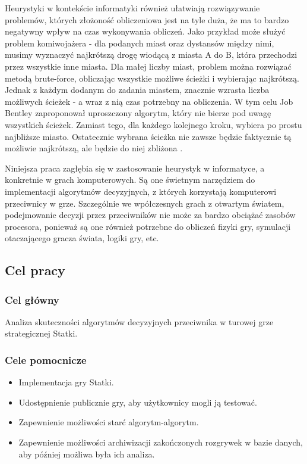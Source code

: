 \indent Heurystyki w kontekście informatyki również ułatwiają rozwiązywanie problemów, których złożoność obliczeniowa jest na tyle duża, że ma to bardzo negatywny wpływ na czas wykonywania obliczeń. Jako przykład może służyć problem komiwojażera - dla podanych miast oraz dystansów między nimi, musimy wyznaczyć najkrótszą drogę wiodącą z miasta A do B, która przechodzi przez wszystkie inne miasta. Dla małej liczby miast, problem można rozwiązać metodą brute-force, obliczając wszystkie możliwe ścieżki i wybierając najkrótszą. Jednak z każdym dodanym do zadania miastem, znacznie wzrasta liczba możliwych ścieżek - a wraz z nią czas potrzebny na obliczenia. W tym celu Job Bentley zaproponował uproszczony algorytm, który nie bierze pod uwagę wszystkich ścieżek. Zamiast tego, dla każdego kolejnego kroku, wybiera po prostu najbliższe miasto. Ostatecznie wybrana ścieżka nie zawsze będzie faktycznie tą możliwie najkrótszą, ale będzie do niej zbliżona \cite{Hjeij2023}.

\indent Niniejsza praca zagłębia się w zastosowanie heurystyk w informatyce, a konkretnie w grach komputerowych. Są one świetnym narzędziem do implementacji algorytmów decyzyjnych, z których korzystają komputerowi przeciwnicy w grze. Szczególnie we wpółczesnych grach z otwartym światem, podejmowanie decyzji przez przeciwników nie może za bardzo obciążać zasobów procesora, ponieważ są one również potrzebne do obliczeń fizyki gry, symulacji otaczającego gracza świata, logiki gry, etc.

\subsection{Cel pracy}
\subsubsection{Cel główny}
Analiza skuteczności algorytmów decyzyjnych przeciwnika w turowej grze strategicznej Statki.

\subsubsection{Cele pomocnicze}
\begin{itemize}
    \item Implementacja gry Statki.
    \item Udostępnienie publicznie gry, aby użytkownicy mogli ją testować.
    \item Zapewnienie możliwości starć algorytm-algorytm.
    \item Zapewnienie możliwości archiwizacji zakończonych rozgrywek w bazie danych, aby później możliwa była ich analiza.
\end{itemize}

